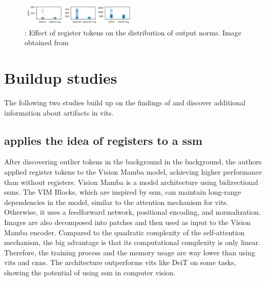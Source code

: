 \documentclass[conference]{IEEEtran}
\begin{document}
  \begin{figure}
    \centering
    \includegraphics[width=0.5\textwidth]{figures/register-norm-result.png}
    \caption{: Effect of register tokens on the distribution of output norms. Image obtained from \cite{registers}}
    \label{fig:register-norm-result}
  \end{figure}


  \section{Buildup studies}
  \label{sec:buildup}
  
  The following two studies build up on the findings of \citeauthor{registers} \cite{registers} and discover additional information about artifacts in \acp{vit}.

  \subsection{\citeauthor{mamba-needs-registers} \cite{mamba-needs-registers} applies the idea of registers to a \ac{ssm}}
  \label{sec:buildup:mamba}

  After discovering outlier tokens in the background in the background, the authors applied register tokens to the Vision Mamba model, achieving higher performance than without registers. Vision Mamba \cite{vision-mamba} is a model architecture using bidirectional \acfp{ssm}. The VIM Blocks, which are inspired by \ac{ssm}, can maintain long-range dependencies in the model, similar to the attention mechanism for \acp{vit}. Otherwise, it uses a feedforward network, positional encoding, and normalization. Images are also decomposed into patches and then used as input to the Vision Mamba encoder. Compared to the quadratic complexity of the self-attention mechanism, the big advantage is that its computational complexity is only linear. Therefore, the training process and the memory usage are way lower than using \acp{vit} and \acp{cnn}. The architecture outperforms \acp{vit} like DeiT \cite{deit} on some tasks, showing the potential of using \ac{ssm} in computer vision. \cite{vision-mamba} \cite{mamba-needs-registers}
\end{document}
